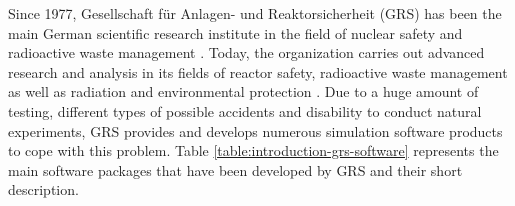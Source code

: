Since 1977, Gesellschaft für Anlagen- und Reaktorsicherheit (GRS) has been the main German scientific research institute in the field of nuclear safety and radioactive waste management \cite{grs:grs-general-info}. Today, the organization carries out advanced research and analysis in its fields of reactor safety, radioactive waste management as well as radiation and environmental protection \cite{grs:grs-general-info}. Due to a huge amount of testing, different types of possible accidents and disability to conduct natural experiments, GRS provides and develops numerous simulation software products to cope with this problem. Table \ref{table:introduction-grs-software} represents the main software packages that have been developed by GRS and their short description.\\

